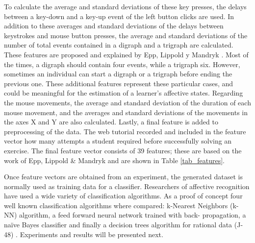 \documentclass[a4paper]{llncs}
\begin{document}
To calculate the average and standard deviations of these key presses, the delays
between a key-down and a key-up event of the left button clicks are used. In
addition to these averages and standard deviations of the delays between
keystrokes and mouse button presses, the average and standard deviations of the
number of total events contained in a digraph and a trigraph are calculated.
These features are proposed and explained by Epp, Lippold y Mandryk \cite{epp2011identifying}. Most
of the times, a digraph should contain four events, while a trigraph six.
However, sometimes an individual can start a digraph or a trigraph before ending
the previous one. These additional features represent these particular cases,
and could be meaningful for the estimation of a learner's affective states.
Regarding the mouse movements, the average and standard deviation of the
duration of each mouse movement, and the averages and standard deviations of the
movements in the axes X and Y are also calculated. Lastly, a final feature is
added to preprocessing of the data. The web tutorial recorded  and included in the feature vector how many attempts
a student required before successfully solving an exercise. The final feature vector
consists of 39 features; these are based on the work of Epp, Lippold \& Mandryk
\cite{epp2011identifying} and are shown in Table \ref{tab_features}.

Once feature vectors are obtained from an experiment, the generated dataset is
normally used as training data for a classifier. Researchers of affective
recognition have used a wide variety of classification algorithms. As a proof of
concept four well known classification algorithms where compared: k-Nearest
Neighbors (k-NN) algorithm, a feed forward neural network trained with back-
propagation, a na\"ive Bayes classifier and finally a decision trees algorithm for
rational data (J-48) \cite{tan2006introduction}. Experiments and results will be presented next. 
\end{document}
